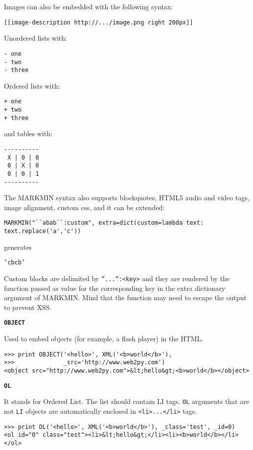 \documentclass[justified,sixbynine,notoc]{tufte-book}
\def\ft{\small\tt}
\def\inxx#1{\index{#1}}
\begin{document}
\begin{fullwidth}
Images can also be embedded with the following syntax:

\begin{lstlisting}
[[image-description http://.../image.png right 200px]]
\end{lstlisting}

Unordered lists with:
\begin{lstlisting}
- one
- two
- three
\end{lstlisting}

Ordered lists with:
\begin{lstlisting}
+ one
+ two
+ three
\end{lstlisting}
\noindent and tables with:
\begin{lstlisting}
----------
 X | 0 | 0
 0 | X | 0
 0 | 0 | 1
----------
\end{lstlisting}

The MARKMIN syntax also supports blockquotes, HTML5 audio and video tags, image alignment, custom css, and it can be extended:

\begin{lstlisting}
MARKMIN("``abab``:custom", extra=dict(custom=lambda text: text.replace('a','c'))
\end{lstlisting}
\noindent generates

{\ft 'cbcb'}

Custom blocks are delimited by {\ft ``...``:<key>} and they are rendered by the function passed as value for the corresponding key in the extra dictionary argument of MARKMIN. Mind that the function may need to escape the output to prevent XSS.

{\bf {\ft OBJECT}}

Used to embed objects (for example, a flash player) in the HTML.

\inxx{OBJECT}
\begin{lstlisting}
>>> print OBJECT('<hello>', XML('<b>world</b>'),
>>>              _src='http://www.web2py.com')
<object src="http://www.web2py.com">&lt;hello&gt;<b>world</b></object>
\end{lstlisting}

{\bf {\ft OL}}

It stands for Ordered List. The list should contain LI tags. {\ft OL} arguments that are not {\ft LI} objects are automatically enclosed in {\ft <li>...</li>} tags.

\inxx{OL}
\begin{lstlisting}
>>> print OL('<hello>', XML('<b>world</b>'), _class='test', _id=0)
<ol id="0" class="test"><li>&lt;hello&gt;</li><li><b>world</b></li></ol>
\end{lstlisting}


\end{fullwidth}
\end{document}
